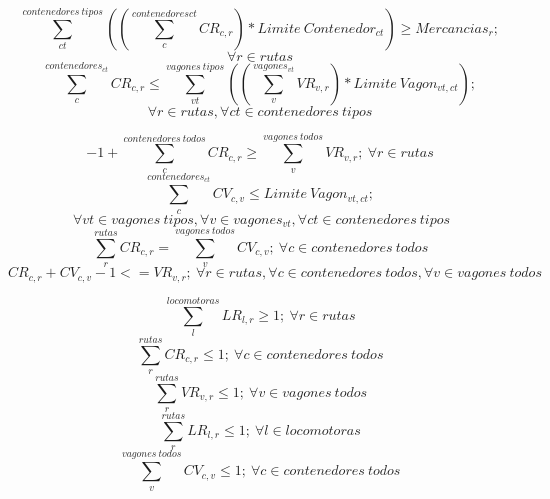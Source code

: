 \documentclass[11pt,spanish]{article}
\begin{document}
			$$
				\sum_{ct}^{contenedores\ tipos}\left(\left( \sum_c^{contenedores{ct}} CR_{c,r} \right) * Limite\ Contenedor_{ct} \right) \geq  Mercancias_r;
			$$
			\begin{equation}
				\label{eq:SatisfaceMercancias}
				\forall r \in rutas
			\end{equation}
			$$
				\sum_c^{contenedores_{ct}} CR_{c,r} \leq \sum_{vt}^{vagones\ tipos} \left( \left(\sum_v^{vagones_{vt}}VR_{v,r}\right)*Limite\ Vagon_{vt,ct} \right);
			$$
			\begin{equation}
				\label{eq:RutaCumpleLimitesContenedores}
				\forall r \in rutas,\forall ct \in contenedores\ tipos
			\end{equation}
			
			\begin{equation}
				\label{eq:EvitaUsoInnecesario}
				-1+\sum_c^{contenedores\ todos} CR_{c,r} \geq \sum_v^{vagones\ todos} VR_{v,r};\ \forall r \in rutas
			\end{equation}
			$$
			\sum_c^{contenedores_{ct}}CV_{c,v} \leq Limite\ Vagon_{vt,ct};
			$$
			\begin{equation}
				\label{eq:VagonesCumplenLimitesContenedores}
				\ \forall vt \in vagones\ tipos, \forall v \in vagones_{vt}, \forall ct \in contenedores\ tipos
			\end{equation}
			\begin{equation}
				\label{eq:CoherenciaTotalidadContenedores}
				\sum_r^{rutas} CR_{c,r} = \sum_v^{vagones\ todos} CV_{c,v};\ \forall c \in contenedores\ todos
			\end{equation}
			\begin{equation}
				\label{eq:Coherencia_CV_CR}
				CR_{c,r}+CV_{c,v}-1<=VR_{v,r};\ \forall r \in rutas, \forall c \in contenedores\ todos, \forall v \in vagones\ todos
			\end{equation}


			\begin{equation}
				\label{eq:alMenosUnaLocomotoraPorRuta}
				\sum_l^{locomotoras}LR_{l,r} \geq 1;\ \forall r \in rutas
			\end{equation}
			\begin{equation}
				\label{eq:unaRutaPorContenedor}
				\sum_r^{rutas}CR_{c,r} \leq 1;\ \forall c \in contenedores\ todos
			\end{equation}
			\begin{equation}
				\label{eq:unaRutaPorVagon}
				\sum_r^{rutas}VR_{v,r} \leq 1;\ \forall v \in vagones\ todos
			\end{equation}
			\begin{equation}
				\label{eq:unaRutaPorLocomotora}
				\sum_r^{rutas} LR_{l,r} \leq 1;\ \forall l \in locomotoras
			\end{equation}
			\begin{equation}
				\label{eq:unVagonPorContenedor}
				\sum_v^{vagones\ todos}CV_{c,v} \leq 1;\ \forall c \in contenedores\ todos
			\end{equation}
			
\end{document}
